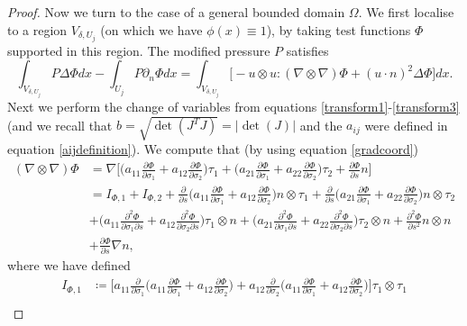\documentclass[12pt,a4paper]{article}
\theoremstyle{definition}
\theoremstyle{remark}
\numberwithin{equation}{section}
\begin{document}
\begin{proof}
Now we turn to the case of a general bounded domain $\Omega$. We first localise to a region $V_{\delta,U_j}$ (on which we have $\phi (x) \equiv 1$), by taking test functions $\Phi$ supported in this region. The modified pressure $P$ satisfies
\begin{equation} \label{localisedpressureeq}
\int_{V_{\delta,U_j}} P \Delta \Phi dx - \int_{U_j} P \partial_n \Phi dx  = \int_{V_{\delta,U_j}} \bigg[ - u \otimes u : (\nabla \otimes \nabla) \Phi + (u \cdot n)^2  \Delta \Phi \bigg] dx.
\end{equation}
Next we perform the change of variables from equations \eqref{transform1}-\eqref{transform3} (and we recall that $b = \sqrt{\det (J^T J)} = \lvert \det (J) \rvert$ and the $a_{ij}$ were defined in equation \eqref{aijdefinition}). We compute that (by using equation \eqref{gradcoord})
\begin{align*}
(\nabla \otimes \nabla) \Phi &= \nabla \bigg[ \bigg( a_{11} \frac{\partial \Phi}{\partial \sigma_1} + a_{12} \frac{\partial \Phi}{\partial \sigma_2} \bigg) \tau_1 + \bigg( a_{21} \frac{\partial \Phi}{\partial \sigma_1} + a_{22} \frac{\partial \Phi}{\partial \sigma_2} \bigg) \tau_2 + \frac{\partial \Phi}{\partial s} n \bigg] \\
&= I_{\Phi,1} + I_{\Phi,2} + \frac{\partial}{\partial s} \bigg( a_{11} \frac{\partial \Phi}{\partial \sigma_1} + a_{12} \frac{\partial \Phi}{\partial \sigma_2} \bigg) n \otimes \tau_1 + \frac{\partial}{\partial s} \bigg( a_{21} \frac{\partial \Phi}{\partial \sigma_1} + a_{22} \frac{\partial \Phi}{\partial \sigma_2} \bigg) n \otimes \tau_2 \\
&+ \bigg( a_{11} \frac{\partial^2 \Phi}{\partial \sigma_1 \partial s} + a_{12} \frac{\partial^2 \Phi}{\partial \sigma_2 \partial s} \bigg) \tau_1 \otimes n + \bigg( a_{21} \frac{\partial^2 \Phi}{\partial \sigma_1 \partial s} + a_{22} \frac{\partial^2 \Phi}{\partial \sigma_2 \partial s} \bigg) \tau_2 \otimes n + \frac{\partial^2 \Phi}{\partial s^2} n \otimes n \\
&+ \frac{\partial \Phi}{\partial s} \nabla n,
\end{align*}
where we have defined
\begin{align*}
I_{\Phi,1} &\coloneqq \bigg[ a_{11} \frac{\partial}{\partial \sigma_1} \bigg( a_{11} \frac{\partial \Phi}{\partial \sigma_1} + a_{12} \frac{\partial \Phi}{\partial \sigma_2} \bigg) + a_{12} \frac{\partial}{\partial \sigma_2} \bigg( a_{11} \frac{\partial \Phi}{\partial \sigma_1} + a_{12} \frac{\partial \Phi}{\partial \sigma_2} \bigg) \bigg] \tau_1 \otimes \tau_1 \\

\end{align*}
\end{proof}
\end{document}
